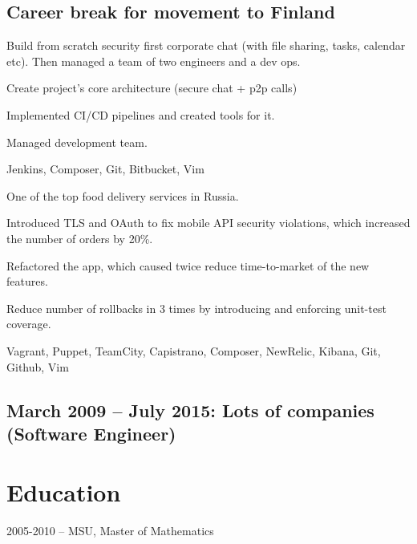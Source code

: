 \documentclass{cv}
\begin{document}
  \subsection* {Career break for movement to Finland}





\pagebreak

    Build from scratch security first corporate chat (with file sharing,
    tasks, calendar etc). Then managed a team of two engineers and a dev ops.
    \begin{gaas}
      \item Create project's core architecture (secure chat + p2p calls)
      \item Implemented CI/CD pipelines and created tools for it.
      \item Managed development team.
    \end{gaas}
    \devtools
      Jenkins, Composer, Git, Bitbucket, Vim

    One of the top food delivery services in Russia.
    \begin{gaas}
      \item Introduced TLS and OAuth to fix mobile API security violations,
        which increased the number of orders by 20\%.
      \item Refactored the app, which caused twice reduce time-to-market of
        the new features.
      \item Reduce number of rollbacks in 3 times by introducing and enforcing
        unit-test coverage.
    \end{gaas}
    \devtools
      Vagrant, Puppet, TeamCity, Capistrano, Composer, NewRelic, Kibana, Git,
        Github, Vim
  \subsection* {March 2009 – July 2015: Lots of companies (Software Engineer)}

\section* {Education}
2005-2010 -- MSU, Master of Mathematics
\end{document}
